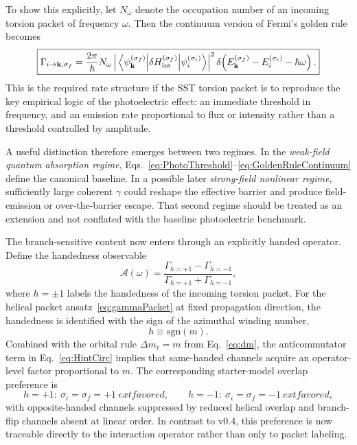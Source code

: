 \documentclass[11pt,a4paper]{article}
\begin{document}
To show this explicitly, let $N_\omega$ denote the occupation number of an incoming torsion packet of frequency $\omega$. Then the continuum version of Fermi's golden rule becomes
\begin{equation}
\label{eq:GoldenRuleContinuum}
\boxed{
\Gamma_{i\to \mathbf k,\sigma_f}
=
\frac{2\pi}{\hbar}
N_\omega
\left|
\matrixel{\psi_{\mathbf k}^{(\sigma_f)}}{\delta H_{\rm int}^{(\sigma_f)}}{\psi_i^{(\sigma_i)}}
\right|^2
\delta\!\left(
E_{\mathbf k}^{(\sigma_f)}-E_i^{(\sigma_i)}-\hbar\omega
\right).
}
\end{equation}
This is the required rate structure if the SST torsion packet is to reproduce the key empirical logic of the photoelectric effect: an immediate threshold in frequency, and an emission rate proportional to flux or intensity rather than a threshold controlled by amplitude.

A useful distinction therefore emerges between two regimes. In the \emph{weak-field quantum absorption regime}, Eqs.~\eqref{eq:PhotoThreshold}--\eqref{eq:GoldenRuleContinuum} define the canonical baseline. In a possible later \emph{strong-field nonlinear regime}, sufficiently large coherent $\gamma$ could reshape the effective barrier and produce field-emission or over-the-barrier escape. That second regime should be treated as an extension and not conflated with the baseline photoelectric benchmark.

The branch-sensitive content now enters through an explicitly handed operator. Define the handedness observable
\begin{equation}
\label{eq:Asymmetry}
\boxed{
\mathcal A(\omega)
=
\frac{\Gamma_{h=+1}-\Gamma_{h=-1}}{\Gamma_{h=+1}+\Gamma_{h=-1}},
}
\end{equation}
where $h=\pm 1$ labels the handedness of the incoming torsion packet. For the helical packet ansatz~\eqref{eq:gammaPacket} at fixed propagation direction, the handedness is identified with the sign of the azimuthal winding number,
\begin{equation}
\label{eq:h-sign-m}
\boxed{h\equiv \mathrm{sgn}(m).}
\end{equation}
Combined with the orbital rule $\Delta m_\ell=m$ from Eq.~\eqref{eq:dm}, the anticommutator term in Eq.~\eqref{eq:HintCirc} implies that same-handed channels acquire an operator-level factor proportional to $m$. The corresponding starter-model overlap preference is
\begin{equation}
\label{eq:handed-selection}
 h=+1:\ \sigma_i=\sigma_f=+1\ 	ext{favored},
 \qquad
 h=-1:\ \sigma_i=\sigma_f=-1\ 	ext{favored},
\end{equation}
with opposite-handed channels suppressed by reduced helical overlap and branch-flip channels absent at linear order. In contrast to v0.4, this preference is now traceable directly to the interaction operator rather than only to packet labeling.
\end{document}
